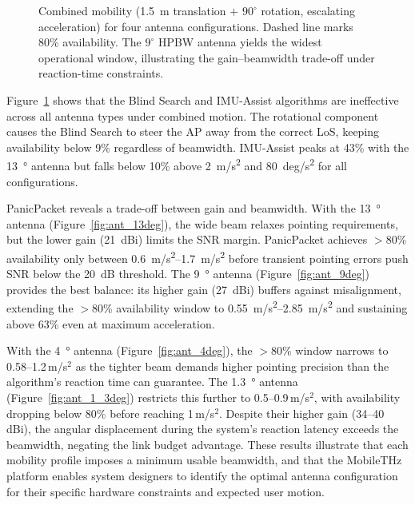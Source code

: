 \documentclass[fleqn,10pt]{wlscirep}
\newcommand{\legline}[2]{%
    \tikz[Blind Search=-0.5ex]{
        \draw[#1, #2, line width=1.5pt] (0,0) -- (0.5,0);
    }%
}
\begin{document}
\begin{figure}[ht!]
    
    \caption{Combined mobility (1.5~m translation $+$ $90^\circ$ rotation, escalating acceleration) for four antenna configurations. Dashed line marks 80\% availability. The $9^\circ$ HPBW antenna yields the widest operational window, illustrating the gain--beamwidth trade-off under reaction-time constraints.}
    \label{fig:antenna_comparison}
\end{figure}

Figure~\ref{fig:antenna_comparison} shows that the Blind Search and IMU-Assist algorithms are ineffective across all antenna types under combined motion. The rotational component causes the Blind Search to steer the AP away from the correct LoS, keeping availability below 9\% regardless of beamwidth. IMU-Assist peaks at 43\% with the \SI{13}{\degree} antenna but falls below 10\% above \SI{2}{m/s^2} and \SI{80}{deg/s^2} for all configurations.

PanicPacket reveals a trade-off between gain and beamwidth. With the \SI{13}{\degree} antenna (Figure~\ref{fig:ant_13deg}), the wide beam relaxes pointing requirements, but the lower gain (\SI{21}{dBi}) limits the SNR margin. PanicPacket achieves $>$80\% availability only between \SIrange{0.6}{1.7}{m/s^2} before transient pointing errors push SNR below the \SI{20}{dB} threshold. The \SI{9}{\degree} antenna (Figure~\ref{fig:ant_9deg}) provides the best balance: its higher gain (\SI{27}{dBi}) buffers against misalignment, extending the $>$80\% availability window to \SIrange{0.55}{2.85}{m/s^2} and sustaining above 63\% even at maximum acceleration.

With the \SI{4}{\degree} antenna (Figure~\ref{fig:ant_4deg}), the $>$80\% window narrows to 0.58--1.2\,m/s$^2$ as the tighter beam demands higher pointing precision than the algorithm's reaction time can guarantee. The \SI{1.3}{\degree} antenna (Figure~\ref{fig:ant_1_3deg}) restricts this further to 0.5--0.9\,m/s$^2$, with availability dropping below 80\% before reaching 1\,m/s$^2$. Despite their higher gain (34--40\,dBi), the angular displacement during the system's reaction latency exceeds the beamwidth, negating the link budget advantage. These results illustrate that each mobility profile imposes a minimum usable beamwidth, and that the MobileTHz platform enables system designers to identify the optimal antenna configuration for their specific hardware constraints and expected user motion.
\end{document}
